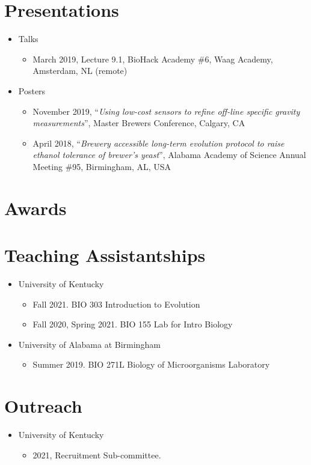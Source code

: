 \documentclass[11pt]{article}
\begin{document}
    \section*{Presentations}
        \begin{itemize}[leftmargin=.25in]
            \item Talks
                \begin{itemize}
                    \item March 2019, Lecture 9.1, BioHack Academy \#6, Waag Academy, Amsterdam, NL (remote)
                \end{itemize}
            \item Posters
                \begin{itemize}
                    \item November 2019, “{\it Using low-cost sensors to refine off-line specific gravity measurements}”, Master Brewers Conference, Calgary, CA
                    \item April 2018, “{\it Brewery accessible long-term evolution protocol to raise ethanol tolerance of brewer’s yeast}”, Alabama Academy of Science Annual Meeting \#95, Birmingham, AL, USA
                \end{itemize}
        \end{itemize}


    \section*{Awards}


    \section*{Teaching Assistantships}
        \begin{itemize}[leftmargin=.25in]
            \item University of Kentucky
                \begin{itemize}
                \item Fall 2021. BIO 303 Introduction to Evolution
                \item Fall 2020, Spring 2021. BIO 155 Lab for Intro Biology
                \end{itemize}
            \item University of Alabama at Birmingham
                \begin{itemize}
                \item Summer 2019. BIO 271L Biology of Microorganisms Laboratory
                \end{itemize}
        \end{itemize}


    \section*{Outreach}
        \begin{itemize}[leftmargin=.25in]
            \item University of Kentucky
                \begin{itemize}
                    \item 2021, Recruitment Sub-committee. 
                \end{itemize}
        
        \end{itemize} 
\end{document}
